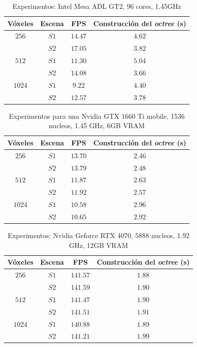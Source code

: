 \begin{table}[ht]
\centering
\begin{tabular}{|c|c|c|c|}
	\hline
	\textbf{Vóxeles} & \textbf{Escena} & \textbf{FPS} & \textbf{Construcción del \textit{octree} (s)} \\
	\hline
	$256$ & $S1$ & $14.47$ & $4.62$ \\
	 & $S2$ & $17.05$ & $3.82$ \\
	\hline
	$512$ & $S1$ & $11.30$ & $5.04$ \\
	 & $S2$ & $14.08$ & $3.66$ \\
	\hline
	$1024$ & $S1$ & $9.22$ & $4.40$ \\
	 & $S2$ & $12.57$ & $3.78$ \\
	\hline
\end{tabular}
\caption{Experimentos: Intel Mesa ADL GT2, 96 cores, 1.45GHz}
\label{tab:cisco-laptop}
\end{table}

\begin{table}[hb]
\centering
\begin{tabular}{|c|c|c|c|}
	\hline
	\textbf{Vóxeles} & \textbf{Escena} & \textbf{FPS} & \textbf{Construcción del \textit{octree} (s)} \\
	\hline
	$256$ & $S1$ & $13.70$ & $2.46$ \\
	 & $S2$ & $13.79$ & $2.48$ \\
	\hline
	$512$ & $S1$ & $11.87$ & $2.63$ \\
	 & $S2$ & $11.92$ & $2.57$ \\
	\hline
	$1024$ & $S1$ & $10.58$ & $2.96$ \\
	 & $S2$ & $10.65$ & $2.92$ \\
	\hline
\end{tabular}
\caption{Experimentos para una Nvidia GTX 1660 Ti mobile, 1536 nucleos, 1.45 GHz, 6GB VRAM}
\label{tab:pizzo-laptop}
\end{table}

\begin{table}[hb]
\centering
\begin{tabular}{|c|c|c|c|}
	\hline
	\textbf{Vóxeles} & \textbf{Escena} & \textbf{FPS} & \textbf{Construcción del \textit{octree} (s)} \\
	\hline
	$256$ & $S1$ & $141.57$ & $1.88$ \\
	 & $S2$ & 141.59 & 1.90 \\
	\hline
	$512$ & $S1$ & $141.47$ & $1.90$ \\
	 & $S2$ & $141.51$ & $1.91$ \\
	\hline
	$1024$ & $S1$ & $140.88$ & $1.89$ \\
	 & $S2$ & $141.21$ & $1.99$ \\
	\hline
\end{tabular}
\caption{Experimentos: Nvidia Geforce RTX 4070, 5888 nucleos, 1.92 GHz, 12GB VRAM}
\label{tab:pizzo-desktop}
\end{table}

